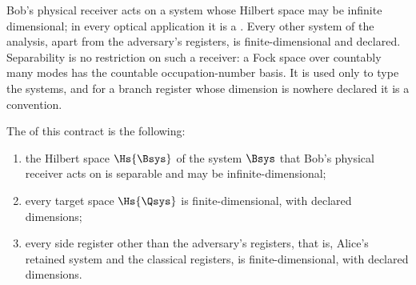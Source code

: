 
Bob's physical receiver acts on a system whose Hilbert space may be infinite
dimensional; in every optical application it is a . Every
other system of the analysis, apart from the adversary's registers, is
finite-dimensional and declared. Separability is no restriction on such a
receiver: a Fock space over countably many modes has the countable
occupation-number basis. It is used only to type the systems, and for a
branch register whose dimension is nowhere declared it is a convention.

\begin{definition}\label{def:system-setting}
The
of this contract is the following:
\begin{enumerate}[label=(\alph*),leftmargin=2.4em]
\item the Hilbert space $\Hs{\Bsys}$ of the system $\Bsys$ that Bob's
  physical receiver acts on is separable and may be infinite-dimensional;
\item every target space $\Hs{\Qsys}$ is finite-dimensional, with declared
  dimensions;
\item every side register other than the adversary's registers, that is,
  Alice's retained system and the classical registers, is finite-dimensional,
  with declared dimensions.
\end{enumerate}
\end{definition}
